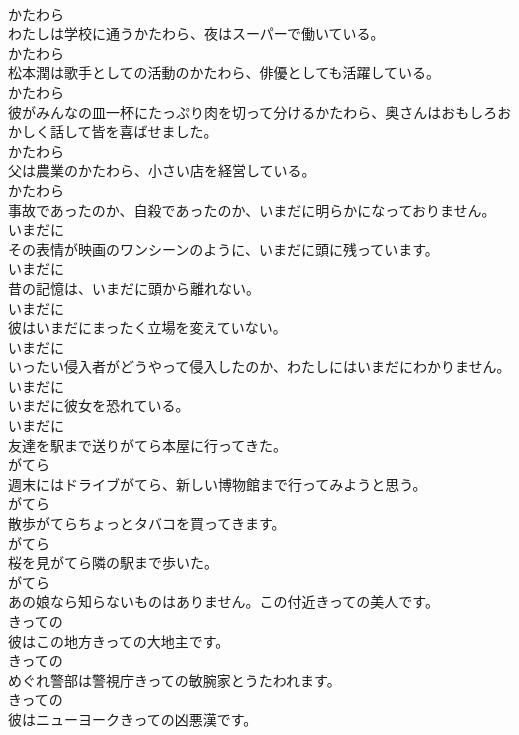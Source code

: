\documentclass[8pt]{extreport}
\begin{document}
\begin{CJK}{UTF8}{min}
\\	かたわら
\\	わたしは学校に通うかたわら、夜はスーパーで働いている。	
\\	かたわら
\\	松本潤は歌手としての活動のかたわら、俳優としても活躍している。	
\\	かたわら
\\	彼がみんなの皿一杯にたっぷり肉を切って分けるかたわら、奥さんはおもしろおかしく話して皆を喜ばせました。	
\\	かたわら
\\	父は農業のかたわら、小さい店を経営している。	
\\	かたわら
\\	事故であったのか、自殺であったのか、いまだに明らかになっておりません。	
\\	いまだに
\\	その表情が映画のワンシーンのように、いまだに頭に残っています。	
\\	いまだに
\\	昔の記憶は、いまだに頭から離れない。	
\\	いまだに
\\	彼はいまだにまったく立場を変えていない。	
\\	いまだに
\\	いったい侵入者がどうやって侵入したのか、わたしにはいまだにわかりません。	
\\	いまだに
\\	いまだに彼女を恐れている。	
\\	いまだに
\\	友達を駅まで送りがてら本屋に行ってきた。	
\\	がてら
\\	週末にはドライブがてら、新しい博物館まで行ってみようと思う。	
\\	がてら
\\	散歩がてらちょっとタバコを買ってきます。	
\\	がてら
\\	桜を見がてら隣の駅まで歩いた。	
\\	がてら
\\	あの娘なら知らないものはありません。この付近きっての美人です。	
\\	きっての
\\	彼はこの地方きっての大地主です。	
\\	きっての
\\	めぐれ警部は警視庁きっての敏腕家とうたわれます。	
\\	きっての
\\	彼はニューヨークきっての凶悪漢です。	

\end{CJK}
\end{document}
